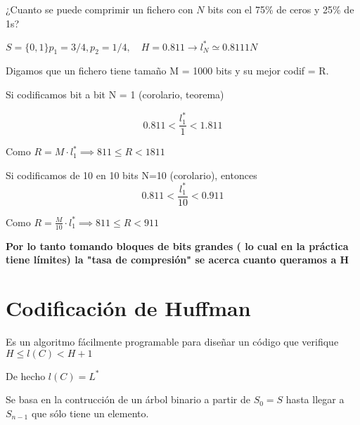 \begin{example}
 ¿Cuanto se puede comprimir un fichero con $N$ bits con el 75\% de ceros y 25\% de 1s? 
	
	$ S= \{0,1\} p_1 = 3/4, p_2 = 1/4, \quad H = 0.811 \rightarrow  l^*_N \simeq 0.8111 N $
	
	Digamos que un fichero tiene tamaño M = 1000 bits y su mejor codif = R.
	
	Si codificamos bit a bit N = 1 (corolario, teorema)
	
	$$0.811 < \frac{l^{*}_1}{1} < 1.811$$
	
	Como $R = M \cdot l^{*}_1 \implies 811 \leq R < 1811$
	
	Si codificamos de 10 en 10 bits N=10 (corolario), entonces
	$$0.811 < \frac{l^{*}_1}{10} < 0.911$$
	
	Como $R = \frac{M}{10} \cdot l^{*}_1 \implies 811 \leq R < 911$
	
	\textbf{Por lo tanto tomando bloques de bits grandes ( lo cual en la práctica tiene límites) la "tasa de compresión" se acerca cuanto queramos a H} 
\end{example}
	

\section{Codificación de Huffman}

Es un algoritmo fácilmente programable para diseñar un código que verifique $H \leq l(C) < H +1$

De hecho $l(C) = L^{*}$

Se basa en la contrucción de un árbol binario a partir de $S_0 = S$ hasta llegar a $S_{n-1}$ que sólo tiene un elemento.

